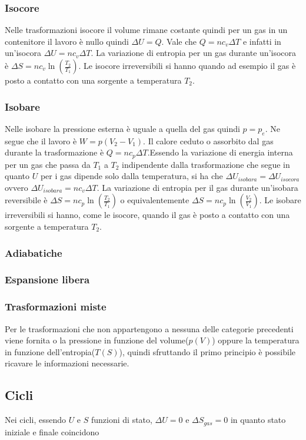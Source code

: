 \documentclass{article}
\begin{document}
\subsubsection*{Isocore}
Nelle trasformazioni isocore il volume rimane costante quindi per un gas in un contenitore il lavoro è nullo quindi $\Delta U=Q$. Vale che $Q= nc_v\Delta T$ e infatti in un'isocora $\Delta U=nc_v\Delta T$. La variazione di entropia per un gas durante un'isocora è $\Delta S=nc_v\ln({\frac{T_2}{T_1}})$. Le isocore irreversibili si hanno quando ad esempio il gas è posto a contatto con una sorgente a temperatura $T_2$. 
\subsubsection*{Isobare}
Nelle isobare la pressione esterna è uguale a quella del gas quindi $p=p_e$. Ne segue che il lavoro è $W=p(V_2-V_1)$. Il calore ceduto o assorbito dal gas durante la trasformazione è $Q=nc_p\Delta T$.Essendo la variazione di energia interna per un gas che passa da $T_1$ a $T_2$ indipendente dalla trasformazione che segue in quanto $U$ per i gas dipende solo dalla temperatura, si ha che $\Delta U_{isobara}= \Delta U_{isocora}$ ovvero $\Delta U_{isobara}=nc_v\Delta T$. La variazione di entropia per il gas durante un'isobara reversibile è $\Delta S=nc_p\ln({\frac{T_2}{T_1}})$ o equivalentemente $\Delta S=nc_p\ln({\frac{V_2}{V_1}})$.                                                                                                                              
Le isobare irreversibili si hanno, come le isocore, quando il gas è posto a contatto con una sorgente a temperatura $T_2$.
\subsubsection*{Adiabatiche}
\subsubsection*{Espansione libera}
\subsubsection*{Trasformazioni miste}
Per le trasformazioni che non appartengono a nessuna delle categorie precedenti viene fornita o la pressione in funzione del volume($p(V)$) oppure la temperatura in funzione dell'entropia($T(S)$), quindi sfruttando il primo principio è possibile ricavare le informazioni necessarie. 
\subsection*{Cicli}
Nei cicli, essendo $U$ e $S$ funzioni di stato, $\Delta U=0$ e $\Delta S_{gas}=0$ in quanto stato iniziale e finale coincidono
\end{document}
